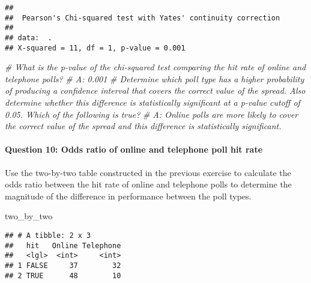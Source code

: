 \documentclass[
]{article}
\newenvironment{Shaded}{\begin{snugshade}}{\end{snugshade}}
\newcommand{\CommentTok}[1]{\textcolor[rgb]{0.56,0.35,0.01}{\textit{#1}}}
\newcommand{\NormalTok}[1]{#1}
\begin{document}
\begin{verbatim}
## 
##  Pearson's Chi-squared test with Yates' continuity correction
## 
## data:  .
## X-squared = 11, df = 1, p-value = 0.001
\end{verbatim}

\begin{Shaded}
\begin{Highlighting}[]
\CommentTok{\# What is the p{-}value of the chi{-}squared test comparing the hit rate of online and telephone polls?}
\CommentTok{\# A: 0.001}
\CommentTok{\# Determine which poll type has a higher probability of producing a confidence interval that covers the correct value of the spread. Also determine whether this difference is statistically significant at a p{-}value cutoff of 0.05. Which of the following is true?}
\CommentTok{\# A: Online polls are more likely to cover the correct value of the spread and this difference is statistically significant.}
\end{Highlighting}
\end{Shaded}

\hypertarget{question-10-odds-ratio-of-online-and-telephone-poll-hit-rate}{%
\paragraph{Question 10: Odds ratio of online and telephone poll hit
rate}\label{question-10-odds-ratio-of-online-and-telephone-poll-hit-rate}}

Use the two-by-two table constructed in the previous exercise to
calculate the odds ratio between the hit rate of online and telephone
polls to determine the magnitude of the difference in performance
between the poll types.

\begin{Shaded}
\begin{Highlighting}[]
\NormalTok{two\_by\_two}
\end{Highlighting}
\end{Shaded}

\begin{verbatim}
## # A tibble: 2 x 3
##   hit   Online Telephone
##   <lgl>  <int>     <int>
## 1 FALSE     37        32
## 2 TRUE      48        10
\end{verbatim}
\end{document}
